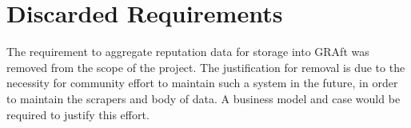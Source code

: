 
\section{Discarded Requirements}

The requirement to aggregate reputation data for storage into GRAft was removed from the scope of the project. The justification for removal is due to the necessity for community effort to maintain such a system in the future, in order to maintain the scrapers and body of data. A business model and case would be required to justify this effort. 







